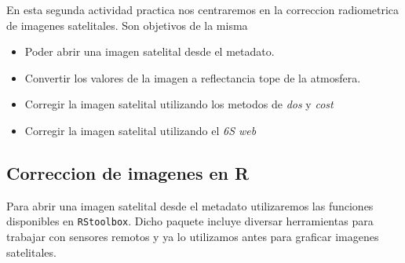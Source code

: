 
En esta segunda actividad practica nos centraremos en la correccion radiometrica
de imagenes satelitales. Son objetivos de la misma

\begin{itemize}
    \item Poder abrir una imagen satelital desde el metadato.
    \item Convertir los valores de la imagen a reflectancia tope de la
        atmosfera.
    \item Corregir la imagen satelital utilizando los metodos de \emph{dos} y
        \emph{cost}
    \item Corregir la imagen satelital utilizando el \emph{6S web}
\end{itemize}

\subsection{Correccion de imagenes en R}
\label{sub:corr:r}
Para abrir una imagen satelital desde el metadato utilizaremos las funciones
disponibles en \texttt{RStoolbox}. Dicho paquete incluye diversar herramientas
para trabajar con sensores remotos y ya lo utilizamos antes para graficar
imagenes satelitales.

